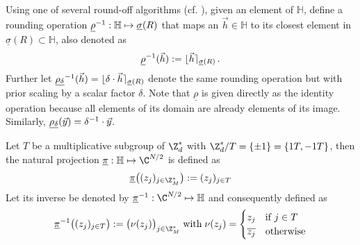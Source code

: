 \begin{frame}[c]
  \begin{definition}
    Using one of several round-off algorithms (cf. \cite{2013-rlwe-toolkit}), given an element of $\mathbb{H}$, define a rounding operation $\underline{\rho}^{-1}: \mathbb{H} \mapsto \underline{\sigma}(R)$ that maps an $\vec{h} \in \mathbb{H}$ to its closest element in $\underline{\sigma}(R) \subset \mathbb{H}$, also denoted as
    $$\underline{\rho}^{-1}(\vec{h}) := \lfloor \vec{h} \rceil_{\underline{\sigma}(R)}\,.$$
    Further let $\underline{\rho_\delta}^{-1}(\vec{h}) = \lfloor \delta \cdot \vec{h} \rceil_{\underline{\sigma}(R)}$ denote the same rounding operation but with prior scaling by a scalar factor $\delta$.
    Note that $\underline{\rho}$ is given directly as the identity operation because all elements of its domain are already elements of its image. Similarly, $\underline{\rho_\delta}(\vec{y}) = \delta^{-1} \cdot \vec{y}$.
  \end{definition}
\end{frame}

\begin{frame}[c]
  \begin{definition}
    Let $T$ be a multiplicative subgroup of $\Z_d^*$ with $\Z_d^* / T = \{\pm 1\} = \{1T, -1T\}$, then the natural projection $\underline{\pi}: \mathbb{H} \mapsto \C^{N/2}$ is defined as
    $$\underline{\pi}\big((z_j)_{j \in \Z_M^*}\big) := (z_j)_{j \in T}$$
    Let its inverse be denoted by $\underline{\pi}\inv: \C^{N/2} \mapsto \mathbb{H}$ and consequently defined as
    $$\underline{\pi}\inv\big((z_j)_{j \in T}\big) := \big(\nu(z_j)\big)_{j \in \Z_M^*} \; \mathrm{with} \; \nu(z_j) = \begin{cases}
        z_j            & \text{if } j \in T \\
        \overline{z_j} & \text{otherwise}
      \end{cases}$$
  \end{definition}
\end{frame}

